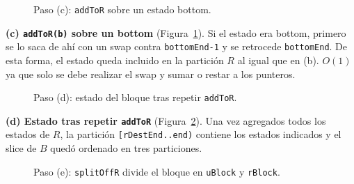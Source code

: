 \begin{figure}[h]
\centering
{}
\caption[]{Paso (c): \texttt{addToR} sobre un estado bottom.}
\label{fig:refinable-split-c}
\end{figure}

\textbf{(c) \textbf{\texttt{addToR(b)}} sobre un bottom} (Figura~\ref{fig:refinable-split-c}). Si el estado era bottom, primero se lo saca de ahí con un swap contra \texttt{bottomEnd-1} y se retrocede \texttt{bottomEnd}. De esta forma, el estado queda incluido en la partición $R$ al igual que en (b). $O(1)$ ya que solo se debe realizar el swap y sumar o restar a los punteros.

\begin{figure}[h]
\centering
{}
\caption[]{Paso (d): estado del bloque tras repetir \texttt{addToR}.}
\label{fig:refinable-split-d}
\end{figure}

\textbf{(d) Estado tras repetir \textbf{\texttt{addToR}}} (Figura~\ref{fig:refinable-split-d}). Una vez agregados todos los estados de $R$, la partición \texttt{[rDestEnd..end)} contiene los estados indicados y el slice de $B$ quedó ordenado en tres particiones.

\begin{figure}[h]
\centering
{}
\caption[]{Paso (e): \texttt{splitOffR} divide el bloque en \texttt{uBlock} y \texttt{rBlock}.}
\label{fig:refinable-split-e}
\end{figure}

